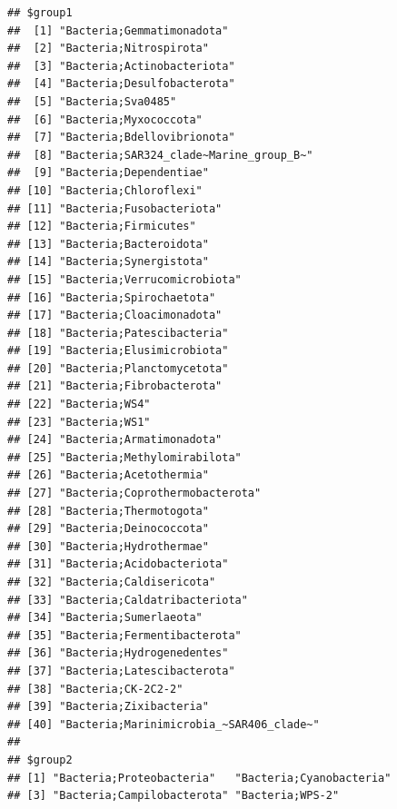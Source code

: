 \documentclass[
]{book}
\newenvironment{Shaded}{\begin{snugshade}}{\end{snugshade}}
\newcommand{\CommentTok}[1]{\textcolor[rgb]{0.56,0.35,0.01}{\textit{#1}}}
\newcommand{\NormalTok}[1]{#1}
\newcommand{\SpecialCharTok}[1]{\textcolor[rgb]{0.00,0.00,0.00}{#1}}
\begin{document}
\begin{Shaded}
\end{Shaded}

\begin{verbatim}
## $group1
##  [1] "Bacteria;Gemmatimonadota"              
##  [2] "Bacteria;Nitrospirota"                 
##  [3] "Bacteria;Actinobacteriota"             
##  [4] "Bacteria;Desulfobacterota"             
##  [5] "Bacteria;Sva0485"                      
##  [6] "Bacteria;Myxococcota"                  
##  [7] "Bacteria;Bdellovibrionota"             
##  [8] "Bacteria;SAR324_clade~Marine_group_B~" 
##  [9] "Bacteria;Dependentiae"                 
## [10] "Bacteria;Chloroflexi"                  
## [11] "Bacteria;Fusobacteriota"               
## [12] "Bacteria;Firmicutes"                   
## [13] "Bacteria;Bacteroidota"                 
## [14] "Bacteria;Synergistota"                 
## [15] "Bacteria;Verrucomicrobiota"            
## [16] "Bacteria;Spirochaetota"                
## [17] "Bacteria;Cloacimonadota"               
## [18] "Bacteria;Patescibacteria"              
## [19] "Bacteria;Elusimicrobiota"              
## [20] "Bacteria;Planctomycetota"              
## [21] "Bacteria;Fibrobacterota"               
## [22] "Bacteria;WS4"                          
## [23] "Bacteria;WS1"                          
## [24] "Bacteria;Armatimonadota"               
## [25] "Bacteria;Methylomirabilota"            
## [26] "Bacteria;Acetothermia"                 
## [27] "Bacteria;Coprothermobacterota"         
## [28] "Bacteria;Thermotogota"                 
## [29] "Bacteria;Deinococcota"                 
## [30] "Bacteria;Hydrothermae"                 
## [31] "Bacteria;Acidobacteriota"              
## [32] "Bacteria;Caldisericota"                
## [33] "Bacteria;Caldatribacteriota"           
## [34] "Bacteria;Sumerlaeota"                  
## [35] "Bacteria;Fermentibacterota"            
## [36] "Bacteria;Hydrogenedentes"              
## [37] "Bacteria;Latescibacterota"             
## [38] "Bacteria;CK-2C2-2"                     
## [39] "Bacteria;Zixibacteria"                 
## [40] "Bacteria;Marinimicrobia_~SAR406_clade~"
## 
## $group2
## [1] "Bacteria;Proteobacteria"   "Bacteria;Cyanobacteria"   
## [3] "Bacteria;Campilobacterota" "Bacteria;WPS-2"
\end{verbatim}
\end{document}
